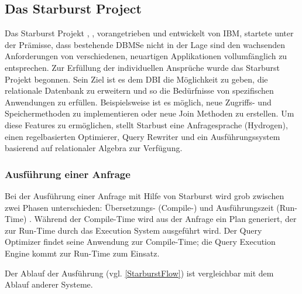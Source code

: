 \subsection{Das Starburst Project}

Das Starburst Projekt \cite{lohman1988Starbust}, \cite{haas1989extensible}, vorangetrieben und entwickelt von IBM,  startete unter der Prämisse, dass bestehende DBMSe nicht in der Lage sind den wachsenden Anforderungen von verschiedenen, neuartigen Applikationen vollumfänglich zu entsprechen. Zur Erfüllung der individuellen Ansprüche wurde das Starburst Projekt begonnen. Sein Ziel ist es dem \ac{DBI} die Möglichkeit zu geben, die relationale Datenbank zu erweitern und so die Bedürfnisse von spezifischen Anwendungen zu erfüllen. Beispielsweise ist es möglich, neue Zugriffs- und Speichermethoden zu implementieren oder neue Join Methoden zu erstellen. Um diese Features zu ermöglichen, stellt Starbust eine Anfragesprache (Hydrogen), einen regelbasierten Optimierer, Query Rewriter und ein Ausführungssystem basierend auf relationaler Algebra zur Verfügung.


\subsubsection{Ausführung einer Anfrage}

Bei der Ausführung einer Anfrage mit Hilfe von Starburst wird grob zwischen zwei Phasen unterschieden: Übersetzungs- (Compile-) und Ausführungszeit (Run-Time) \cite{haas1989extensible}. Während der Compile-Time wird aus der Anfrage ein Plan generiert, der zur Run-Time durch das Execution System ausgeführt wird. Der Query Optimizer findet seine Anwendung zur Compile-Time; die Query Execution Engine kommt zur Run-Time zum Einsatz.

Der Ablauf der Ausführung (vgl. \ref{StarburstFlow}) ist vergleichbar mit dem Ablauf anderer Systeme.

